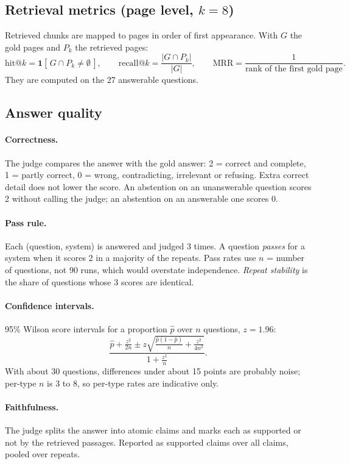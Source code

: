 \documentclass[11pt,a4paper]{article}
\begin{document}
\subsection{Retrieval metrics (page level, $k=8$)}

Retrieved chunks are mapped to pages in order of first appearance. With $G$ the gold pages and
$P_k$ the retrieved pages:
\[
  \text{hit@}k = \mathbf{1}[\,G \cap P_k \neq \emptyset\,], \qquad
  \text{recall@}k = \frac{|G \cap P_k|}{|G|}, \qquad
  \mathrm{MRR} = \frac{1}{\text{rank of the first gold page}}.
\]
They are computed on the 27 answerable questions.

\subsection{Answer quality}

\paragraph{Correctness.} The judge compares the answer with the gold answer: 2 = correct and
complete, 1 = partly correct, 0 = wrong, contradicting, irrelevant or refusing. Extra correct detail
does not lower the score. An abstention on an unanswerable question scores 2 without calling the
judge; an abstention on an answerable one scores 0.

\paragraph{Pass rule.} Each (question, system) is answered and judged 3 times. A question
\emph{passes} for a system when it scores 2 in a majority of the repeats. Pass rates use $n$ =
number of questions, not 90 runs, which would overstate independence. \emph{Repeat stability}
is the share of questions whose 3 scores are identical.

\paragraph{Confidence intervals.} 95\% Wilson score intervals for a proportion $\hat p$ over $n$
questions, $z = 1.96$:
\[
  \frac{\hat p + \frac{z^2}{2n} \pm z\sqrt{\frac{\hat p(1-\hat p)}{n} + \frac{z^2}{4n^2}}}{1 + \frac{z^2}{n}}.
\]
With about 30 questions, differences under about 15 points are probably noise; per-type $n$ is 3
to 8, so per-type rates are indicative only.

\paragraph{Faithfulness.} The judge splits the answer into atomic claims and marks each as
supported or not by the retrieved passages. Reported as supported claims over all claims, pooled
over repeats.
\end{document}
